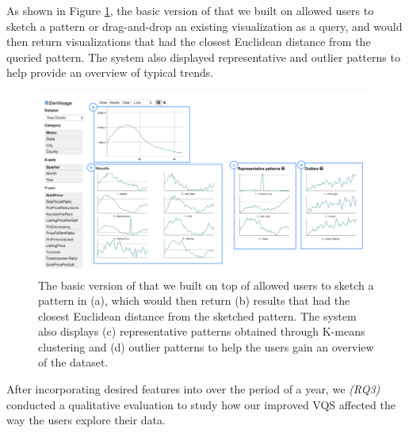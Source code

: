 \par As shown in Figure \ref{oldZV}, the basic version of \zv that we built on allowed users to sketch a pattern or drag-and-drop an existing visualization as a query, and \zv would then return visualizations that had the closest Euclidean distance from the queried pattern. The system also displayed representative and outlier patterns to help provide  an overview of typical trends.
	\begin{figure}[ht!]
	\centering
	\includegraphics[width=\linewidth]{figures/oldZV_nozql.png}
	\caption{The basic version of \zv that we built on top of allowed users to sketch a pattern in (a), which would then return (b) results that had the closest Euclidean distance from the sketched pattern. The system also displays (c) representative patterns obtained through K-means clustering and (d) outlier patterns to help the users gain an overview of the dataset. }
	\label{oldZV}
	\end{figure}
\par After incorporating desired features into \ourVQS over the period of a year, we {\em (RQ3)} conducted a qualitative evaluation to study how our improved VQS affected the way the users explore their data. 
